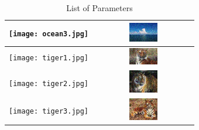 \documentclass[12pt,a4paper]{article}%
\begin{document}
\begin{table}[ht]
\begin{center}
\begin{tabular}{|c|c|}
\hline%
\texttt{[image: ocean3.jpg]}&\includegraphics[width=0.3\textwidth]{outputs/155/ocean3.jpg}\\%
\hline%
\texttt{[image: tiger1.jpg]}&\includegraphics[width=0.3\textwidth]{outputs/155/tiger1.jpg}\\%
\hline%
\texttt{[image: tiger2.jpg]}&\includegraphics[width=0.3\textwidth]{outputs/155/tiger2.jpg}\\%
\hline%
\texttt{[image: tiger3.jpg]}&\includegraphics[width=0.3\textwidth]{outputs/155/tiger3.jpg}\\%
\hline%
\end{tabular}%
\caption{List of Parameters}%
\end{center}%
\end{table}

%
\end{document}
